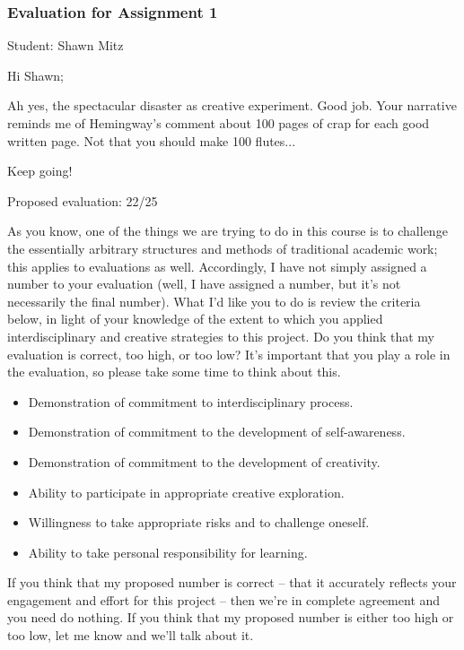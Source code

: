 \documentclass[letterpaper,10pt,DIV=9,headsepline]{scrreprt}
\begin{document}
\newpage

\subsubsection{Evaluation for Assignment 1}

Student: Shawn Mitz

\bigskip
Hi Shawn;

Ah yes, the spectacular disaster as creative experiment. Good job. Your narrative reminds me of Hemingway's comment about 100 pages of crap for each good written page. Not that you should make 100 flutes...

Keep going!

\bigskip
Proposed evaluation: 22/25

\bigskip
As you know, one of the things we are trying to do in this course is
to challenge the essentially arbitrary structures and methods of
traditional academic work; this applies to evaluations as well.
Accordingly, I have not simply assigned a number to your evaluation
(well, I have assigned a number, but it's not necessarily the final
number). What I'd like you to do is review the criteria below, in
light of your knowledge of the extent to which you applied
interdisciplinary and creative strategies to this project. Do you
think that my evaluation is correct, too high, or too low? It's
important that you play a role in the evaluation, so please take some
time to think about this.

\begin{itemize}
\item Demonstration of commitment to interdisciplinary process.
\item Demonstration of commitment to the development of self-awareness.
\item Demonstration of commitment to the development of creativity.
\item Ability to participate in appropriate creative exploration.
\item Willingness to take appropriate risks and to challenge oneself.
\item Ability to take personal responsibility for learning.
\end{itemize}

If you think that my proposed number is correct -- that it accurately
reflects your engagement and effort for this project -- then we're in
complete agreement and you need do nothing. If you think that my
proposed number is either too high or too low, let me know and we'll
talk about it.
\end{document}
